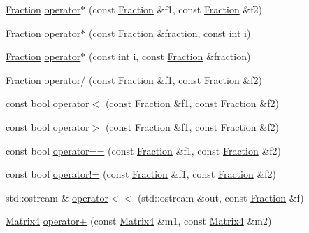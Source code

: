 \begin{DoxyCompactItemize}
\item 
\hyperlink{classprism_1_1_fraction}{Fraction} \hyperlink{namespaceprism_ac4f48e3429a86bafcc7c21a2bd6a7ae1}{operator$\ast$} (const \hyperlink{classprism_1_1_fraction}{Fraction} \&f1, const \hyperlink{classprism_1_1_fraction}{Fraction} \&f2)
\item 
\hyperlink{classprism_1_1_fraction}{Fraction} \hyperlink{namespaceprism_a1f5007702b28b447f62c3b9df62f2aa4}{operator$\ast$} (const \hyperlink{classprism_1_1_fraction}{Fraction} \&fraction, const int i)
\item 
\hyperlink{classprism_1_1_fraction}{Fraction} \hyperlink{namespaceprism_af1ff5871f65565a84b886c5013bcd50a}{operator$\ast$} (const int i, const \hyperlink{classprism_1_1_fraction}{Fraction} \&fraction)
\item 
\hyperlink{classprism_1_1_fraction}{Fraction} \hyperlink{namespaceprism_a7ba7b5cc9750f0d6cda50f0cb874da6f}{operator/} (const \hyperlink{classprism_1_1_fraction}{Fraction} \&f1, const \hyperlink{classprism_1_1_fraction}{Fraction} \&f2)
\item 
const bool \hyperlink{namespaceprism_a105ac9995ade66ebb2a039ef90751c7a}{operator$<$} (const \hyperlink{classprism_1_1_fraction}{Fraction} \&f1, const \hyperlink{classprism_1_1_fraction}{Fraction} \&f2)
\item 
const bool \hyperlink{namespaceprism_a7122a7ff43fc6aba9cef9d31fe8c7559}{operator$>$} (const \hyperlink{classprism_1_1_fraction}{Fraction} \&f1, const \hyperlink{classprism_1_1_fraction}{Fraction} \&f2)
\item 
const bool \hyperlink{namespaceprism_a5b9e84008b9eaa99d29d4b74cd150cd8}{operator==} (const \hyperlink{classprism_1_1_fraction}{Fraction} \&f1, const \hyperlink{classprism_1_1_fraction}{Fraction} \&f2)
\item 
const bool \hyperlink{namespaceprism_aea72179b12983e614f72acd2b3cbf0e0}{operator!=} (const \hyperlink{classprism_1_1_fraction}{Fraction} \&f1, const \hyperlink{classprism_1_1_fraction}{Fraction} \&f2)
\item 
std\+::ostream \& \hyperlink{namespaceprism_a9c2d182a77a92e6cba7917dbd58f9d87}{operator$<$$<$} (std\+::ostream \&out, const \hyperlink{classprism_1_1_fraction}{Fraction} \&f)
\item 
\hyperlink{classprism_1_1_matrix4}{Matrix4} \hyperlink{namespaceprism_a33537d30f01f996f8a05fc5b1b49ba3b}{operator+} (const \hyperlink{classprism_1_1_matrix4}{Matrix4} \&m1, const \hyperlink{classprism_1_1_matrix4}{Matrix4} \&m2)
\item 

\end{DoxyCompactItemize}
